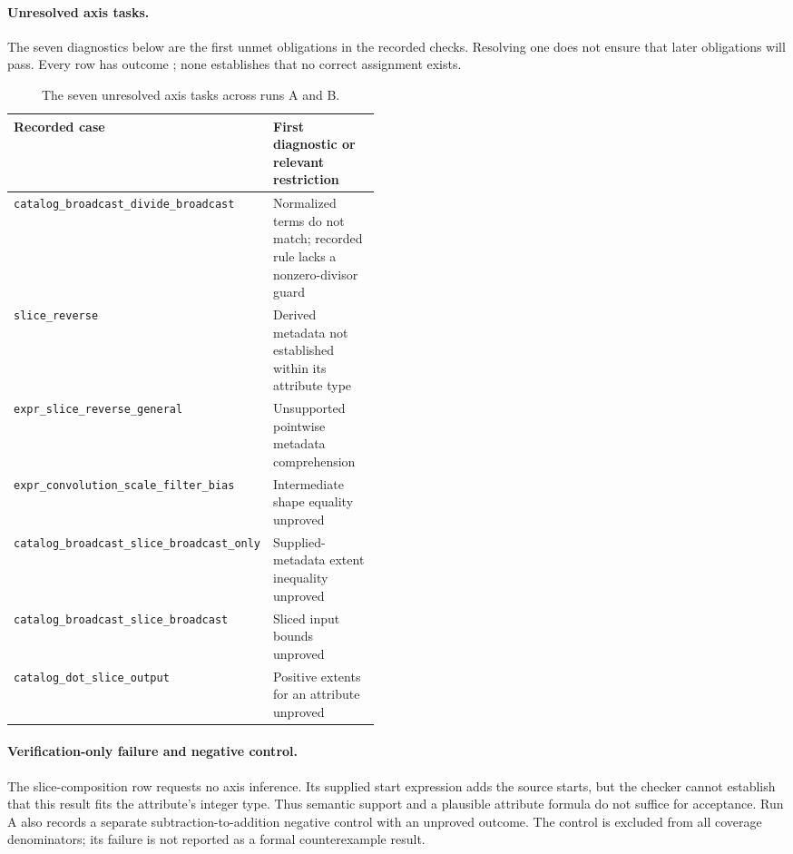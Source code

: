 \paragraph{Unresolved axis tasks.}
The seven diagnostics below are the first unmet obligations in the
recorded checks. Resolving one does not ensure that later obligations
will pass. Every row has outcome ; none establishes that
no correct assignment exists.

\begin{table}[!htbp]
\caption{The seven unresolved axis tasks across runs A and B.}
\label{tab:axis-failure-diagnostics}
\small
\begin{tabularx}{\linewidth}{@{}p{0.47\linewidth}Y@{}}\toprule
Recorded case & First diagnostic or relevant restriction\\\midrule
\nolinkurl{catalog_broadcast_divide_broadcast}
& Normalized terms do not match; recorded rule lacks a nonzero-divisor guard\\
\nolinkurl{slice_reverse}
& Derived metadata not established within its attribute type\\
\nolinkurl{expr_slice_reverse_general}
& Unsupported pointwise metadata comprehension\\
\nolinkurl{expr_convolution_scale_filter_bias}
& Intermediate shape equality unproved\\
\nolinkurl{catalog_broadcast_slice_broadcast_only}
& Supplied-metadata extent inequality unproved\\
\nolinkurl{catalog_broadcast_slice_broadcast}
& Sliced input bounds unproved\\
\nolinkurl{catalog_dot_slice_output}
& Positive extents for an attribute unproved\\\bottomrule
\end{tabularx}
\end{table}

\paragraph{Verification-only failure and negative control.}
The slice-composition row requests no axis inference. Its supplied start
expression adds the source starts, but the checker cannot establish that
this result fits the attribute's integer type. Thus semantic support and
a plausible attribute formula do not suffice for acceptance. Run A also
records a separate subtraction-to-addition negative control with an
unproved outcome. The control is excluded from all coverage denominators;
its failure is not reported as a formal counterexample result.

